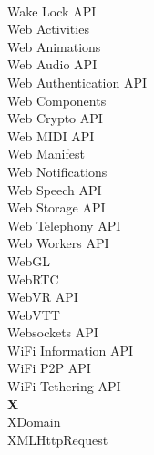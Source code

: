 \begin{multicols}{4}
\\ Wake Lock API
\\ Web Activities
\\ Web Animations 
\\ Web Audio API
\\ Web Authentication API
\\ Web Components
\\ Web Crypto API
\\ Web MIDI API
\\ Web Manifest
\\ Web Notifications
\\ Web Speech API
\\ Web Storage API
\\ Web Telephony API
\\ Web Workers API
\\ WebGL
\\ WebRTC
\\ WebVR API
\\ WebVTT
\\ Websockets API
\\ WiFi Information API
\\ WiFi P2P API
\\ WiFi Tethering API
\\ \textbf{X}
\\ XDomain
\\ XMLHttpRequest
\end{multicols}

\clearpage